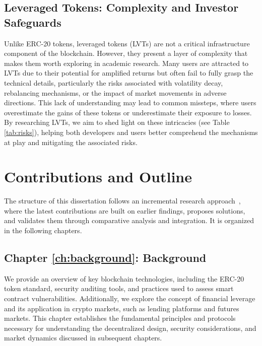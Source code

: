 \subsection{Leveraged Tokens: Complexity and Investor Safeguards}
Unlike ERC-20 tokens, leveraged tokens (LVTs) are not a critical infrastructure component of the blockchain. However, they present a layer of complexity that makes them worth exploring in academic research. Many users are attracted to LVTs due to their potential for amplified returns but often fail to fully grasp the technical details, particularly the risks associated with volatility decay, rebalancing mechanisms, or the impact of market movements in adverse directions. This lack of understanding may lead to common missteps, where users overestimate the gains of these tokens or underestimate their exposure to losses. By researching LVTs, we aim to shed light on these intricacies (see Table \ref{tab:risks}), helping both developers and users better comprehend the mechanisms at play and mitigating the associated risks.


\section{Contributions and Outline} 
The structure of this dissertation follows an incremental research approach~\cite{Incremental_Research}, where the latest contributions are built on earlier findings, proposes solutions, and validates them through comparative analysis and integration. It is organized in the following chapters.

\subsection{Chapter \ref{ch:background}: Background} We provide an overview of key blockchain technologies, including the ERC-20 token standard, security auditing tools, and practices used to assess smart contract vulnerabilities. Additionally, we explore the concept of financial leverage and its application in crypto markets, such as lending platforms and futures markets. This chapter establishes the fundamental principles and protocols necessary for understanding the decentralized design, security considerations, and market dynamics discussed in subsequent chapters.

